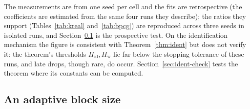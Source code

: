 The measurements are from one seed per cell and the fits are
retrospective (the coefficients are estimated from the same four runs
they describe); the ratios they support (Tables~\ref{tab:kreal}
and~\ref{tab:bpcg}) are reproduced across three seeds in isolated runs,
and Section~\ref{sec:adaptive} is the prospective test. On the
identification mechanism the figure is consistent with
Theorem~\ref{thm:ident} but does not verify it: the theorem's thresholds
$H_{\mathrm{id}},H_{\mathrm w}$ lie far below the stopping tolerance of
these runs, and late drops, though rare, do occur. Section~\ref{sec:ident-check}
tests the theorem where its constants can be computed.

\subsection{An adaptive block size}\label{sec:adaptive}

